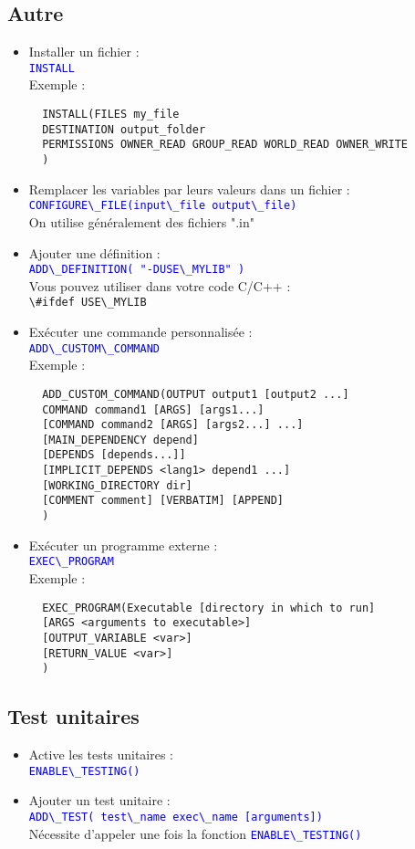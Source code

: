 \documentclass[a4paper,oneside]{article}
\begin{document}
\subsection{Autre}
\begin{itemize}
\item Installer un fichier :\\
  \textcolor{blue}{\verb?INSTALL?}\\
  Exemple :
\begin{verbatim}
  INSTALL(FILES my_file
  DESTINATION output_folder
  PERMISSIONS OWNER_READ GROUP_READ WORLD_READ OWNER_WRITE
  )
\end{verbatim}
\item Remplacer les variables par leurs valeurs dans un fichier :\\
  \textcolor{blue}{\verb?CONFIGURE\_FILE(input\_file output\_file)?}\\
  On utilise généralement des fichiers ".in"
\item Ajouter une définition :\\
  \textcolor{blue}{\verb?ADD\_DEFINITION( "-DUSE\_MYLIB" )?}\\
  Vous pouvez utiliser dans votre code C/C++ :\\
  \textcolor{dgreen}{\verb?\#ifdef USE\_MYLIB ?}
\item Exécuter une commande personnalisée :\\
  \textcolor{blue}{\verb?ADD\_CUSTOM\_COMMAND ?}\\
  Exemple :
\begin{verbatim}
  ADD_CUSTOM_COMMAND(OUTPUT output1 [output2 ...]
  COMMAND command1 [ARGS] [args1...]
  [COMMAND command2 [ARGS] [args2...] ...]
  [MAIN_DEPENDENCY depend]
  [DEPENDS [depends...]]
  [IMPLICIT_DEPENDS <lang1> depend1 ...]
  [WORKING_DIRECTORY dir]
  [COMMENT comment] [VERBATIM] [APPEND]
  )
\end{verbatim}
\item Exécuter un programme externe :\\
  \textcolor{blue}{\verb?EXEC\_PROGRAM ?}\\
  Exemple :
\begin{verbatim}
  EXEC_PROGRAM(Executable [directory in which to run]
  [ARGS <arguments to executable>]
  [OUTPUT_VARIABLE <var>]
  [RETURN_VALUE <var>]
  )
\end{verbatim}
\end{itemize}

\subsection{Test unitaires}
\begin{itemize}
\item Active les tests unitaires :\\
  \textcolor{blue}{\verb?ENABLE\_TESTING()?}
\item Ajouter un test unitaire :\\
  \textcolor{blue}{\verb?ADD\_TEST( test\_name exec\_name [arguments])?}\\
  Nécessite d'appeler une fois la fonction \textcolor{blue}{\verb?ENABLE\_TESTING()?}
\end{itemize}
\end{document}
